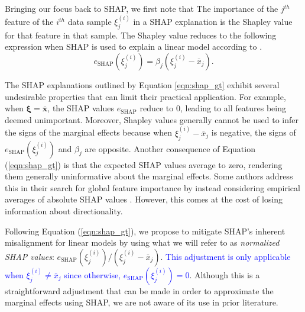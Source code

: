 \documentclass[mnsc,blindrev]{informs3}
\begin{document}
              Bringing our focus back to SHAP, we first note that The importance of the $j^{th}$ feature of the $i^{th}$ data sample $\xi^{(i)}_j$ in a SHAP explanation is the Shapley value for that feature in that sample. The Shapley value reduces to the following expression when SHAP is used to explain a linear model according to \cite{StrumbeljErik2014Epma,lundberg17shap}. 
             \begin{equation}
                \label{eqn:shap_gt}
                e_\text{SHAP}(\xi^{(i)}_j) = \beta_j (\xi^{(i)}_j - \bar{x}_j).
             \end{equation}

            
The SHAP explanations outlined by Equation \ref{eqn:shap_gt} exhibit several undesirable properties that can limit their practical application. For example, when $\boldsymbol{\xi}=\bar{\mathbf{x}}$, the SHAP values $e_\text{SHAP}$ reduce to 0, leading to all features being deemed unimportant. Moreover, Shapley values generally cannot be used to infer the signs of the marginal effects because when $\xi^{(i)}_j - \bar{x}_j$ is negative, the signs of $e_{\text{SHAP}}(\xi^{(i)}_j)$ and $\beta_j$ are opposite. Another consequence of Equation (\ref{eqn:shap_gt})  is that the expected SHAP values average to zero, rendering them generally uninformative about the marginal effects. Some authors address this in their search for global feature importance by instead considering empirical averages of absolute SHAP values \citep{lenaers23rent,maeng23vr,guenther2023useful}. However, this comes at the cost of losing information about directionality.

             Following Equation (\ref{eqn:shap_gt}), we propose to mitigate SHAP's inherent misalignment for linear models by using what we will refer to as \emph{normalized SHAP values}: $e_{\text{SHAP}}(\xi^{(i)}_j) / (\xi^{(i)}_j - \bar{x}_j)$. \textcolor{blue}{This adjustment is only applicable when $\xi^{(i)}_j \neq \bar{x}_j$ since otherwise, $e_{\text{SHAP}}(\xi^{(i)}_j) = 0$}. Although this is a straightforward adjustment that can be made in order to approximate the marginal effects using SHAP, we are not aware of its use in prior literature.  
             
\end{document}
